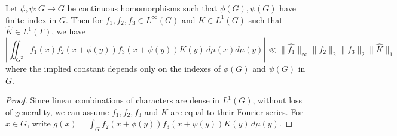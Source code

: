 \begin{lemma}
\label{lem:bourgain_lemma_2}
 Let $\phi, \psi: G \rightarrow G$ be continuous homomorphisms such that $\phi(G), \psi(G)$ have finite index in $G$. Then for $f_1, f_2, f_3 \in L^\infty(G)$ and $K \in L^1(G)$ such that $\widehat{K} \in L^1(\Gamma)$, we have
\begin{equation} \label{eq:k}
\left| \iint_{G^2} f_1(x)f_2(x+ \phi(y))f_3(x+ \psi(y)) K(y) \, d\mu(x) d\mu(y) \right| \ll \| \widehat{f_1} \|_{\infty} \|f_2 \|_2 \| f_3\|_2 \| \widehat{K} \|_1  
\end{equation}
where the implied constant depends only on the indexes of $\phi(G)$ and $\psi(G)$ in $G$.
\end{lemma}

\begin{proof}
Since linear combinations of characters are dense in $L^1(G)$, without loss of generality, we can assume $f_1, f_2, f_3$ and $K$ are equal to their Fourier series. For $x \in G$, write $g(x) = \int_{G} f_2(x+ \phi(y) )f_3(x+ \psi(y) ) K(y) \, d\mu(y)$.


\end{proof}

